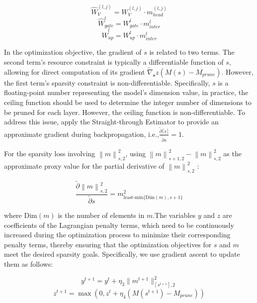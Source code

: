 \begin{equation*}
\hat{W}_{V}^{(l, j)} = W_{V}^{(l, j)} \cdot m_{head}^{(l, j)}
\end{equation*}
\begin{equation*}
\hat{W}_{gate}^{l} = W_{gate}^{l} \cdot m_{inter}^{l}
\end{equation*}
\begin{equation*}
\hat{W}_{up}^{l} = W_{up}^{l} \cdot m_{inter}^{l}
\end{equation*}


In the optimization objective, the gradient of $s$ is related to two terms. The second term's resource constraint is typically a differentiable function of $s$, allowing for direct computation of its gradient $\tilde{\nabla}_{\boldsymbol{s}} z\left(M(s)-M_{prune}\right)$. However, the first term's sparsity constraint is non-differentiable. Specifically, $s$ is a floating-point number representing the model's dimension value, in practice, the ceiling function should be used to determine the integer number of dimensions to be pruned for each layer. However, the ceiling function is non-differentiable. To address this issue, apply the Straight-through Estimator \cite{bengio2013estimatingpropagatinggradientsstochastic} to provide an approximate gradient during backpropagation, i.e.,$\frac{\tilde{\partial}\lceil s\rceil}{\tilde{\partial}s}=1.$

For the sparsity loss involving $\left\|m\right\|_{s,2}^2$, using $\left\|m\right\|_{s+1,2}^2-\left\|m\right\|_{s,2}^2$ as the approximate proxy value for the partial derivative of $\left\|m\right\|_{s,2}^2$ :

\begin{equation*}
\frac{\tilde{\partial}\left\| m \right\|_{s,2}^2}{\tilde{\partial}s} = m_{\text{least-min}\{\mathrm{Dim}(m),s+1\}}^2
\end{equation*}

where $\mathrm{Dim}(m)$ is the number of elements in $m$.The variables $y$ and $z$ are coefficients of the Lagrangian penalty terms, which need to be continuously increased during the optimization process to minimize their corresponding penalty terms, thereby ensuring that the optimization objectives for $s$ and $m$ meet the desired sparsity goals. Specifically, we use gradient ascent to update them as follows:

\begin{equation*}
y^{t+1} = y^t + \eta_3 \| m^{t+1} \|_{\left\lceil s^{t+1} \right\rceil,2}^2
\end{equation*}
\begin{equation*}
z^{t+1} = \max(0, z^t + \eta_4 (M(s^{t+1}) - M_{prune}))
\end{equation*}






